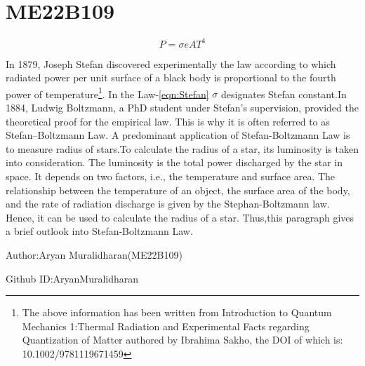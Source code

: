 

\section{ME22B109}

\begin{equation}
    P = \sigma eAT^4
    \label{eqn:Stefan}
\end{equation}

In 1879, Joseph Stefan discovered experimentally the law according to which radiated power per unit surface of a black body is proportional to the fourth power of temperature\footnote{The above information has been written from Introduction to Quantum Mechanics 1:Thermal Radiation and Experimental Facts regarding Quantization of Matter authored by Ibrahima Sakho, the DOI of which is: 10.1002/9781119671459}. 
In the Law-\ref{eqn:Stefan} $ \sigma $ designates Stefan constant.In 1884, Ludwig Boltzmann, a PhD student under Stefan’s  supervision, provided the theoretical proof for the empirical law.  This is why it is often referred to as Stefan–Boltzmann Law.
A predominant application of Stefan-Boltzmann Law is to measure radius of stars.To calculate the radius of a star, its luminosity is taken into consideration. The luminosity is the total power discharged by the star in space. It depends on two factors, i.e., the temperature and surface area. The relationship between the temperature of an object, the surface area of the body, and the rate of radiation discharge is given by the Stephan-Boltzmann law. Hence, it can be used to calculate the radius of a star.
Thus,this paragraph gives a brief outlook into Stefan-Boltzmann Law.

Author:Aryan Muralidharan(ME22B109)

Github ID:AryanMuralidharan

